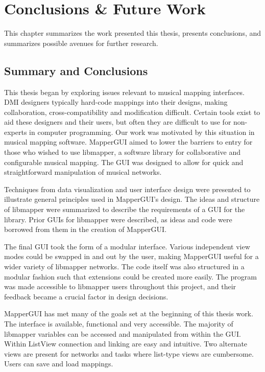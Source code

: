 \chapter{Conclusions \& Future Work}

This chapter summarizes the work presented this thesis, presents conclusions, and summarizes possible avenues for further research.

\section{Summary and Conclusions}

This thesis began by exploring issues relevant to musical mapping interfaces. DMI designers typically hard-code mappings into their designs, making collaboration, cross-compatibility and modification difficult. Certain tools exist to aid these designers and their users, but often they are difficult to use for non-experts in computer programming. Our work was motivated by this situation in musical mapping software. MapperGUI aimed to lower the barriers to entry for those who wished to use libmapper, a software library for collaborative and configurable musical mapping. The GUI was designed to allow for quick and straightforward manipulation of musical networks. 

Techniques from data visualization and user interface design were presented to illustrate general principles used in MapperGUI's design. The ideas and structure of libmapper were summarized to describe the requirements of a GUI for the library. Prior GUIs for libmapper were described, as ideas and code were borrowed from them in the creation of MapperGUI.

The final GUI took the form of a modular interface. Various independent view modes could be swapped in and out by the user, making MapperGUI useful for a wider variety of libmapper networks. The code itself was also structured in a modular fashion such that extensions could be created more easily. The program was made accessible to libmapper users throughout this project, and their feedback became a crucial factor in design decisions. 

MapperGUI has met many of the goals set at the beginning of this thesis work. The interface is available, functional and very accessible. The majority of libmapper variables can be accessed and manipulated from within the GUI. Within ListView connection and linking are easy and intuitive. Two alternate views are present for networks and tasks where list-type views are cumbersome. Users can save and load mappings.

